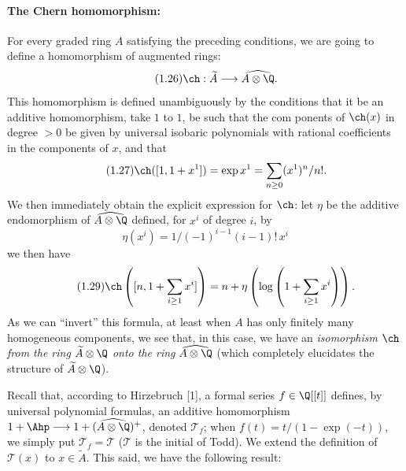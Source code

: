 \paragraph{The Chern homomorphism:}
For every graded ring $A$ satisfying the preceding conditions, we are going to define a homomorphism of augmented rings:
\begin{equation}\tag{1.26}
\ch:\widetilde A\longrightarrow \widehat{A\otimes\Q}.
\end{equation}
This homomorphism is defined unambiguously by the conditions that it be an additive homomorphism, take $1$ to $1$, be such that the com%
%
ponents of $\ch(x)$ in degree $>0$ be given by universal isobaric polynomials with rational coefficients in the components of $x$, and that
\begin{equation}\tag{1.27}
\ch([1,1+x^1])=\exp x^1=\sum_{n\geq0}(x^1)^n/n!.
\end{equation}
We then immediately obtain the explicit expression for $\ch$: let $\eta$ be the additive endomorphism of $\widehat{A\otimes\Q}$ defined, for $x^i$ of degree $i$, by
\begin{equation}\tag{1.28}
\eta(x^i)=1/(-1)^{i-1}(i-1)!\,x^i
\end{equation}
we then have
\begin{equation}\tag{1.29}
\ch\left([n,1+\sum_{i\geq1}x^i]\right)=n+\eta\left(\log\left(1+\sum_{i\geq1}x^i\right)\right).
\end{equation}
As we can ``invert'' this formula, at least when $A$ has only finitely many homogeneous components, we see that, in this case, we have an \emph{isomorphism} $\ch$ \emph{from the ring} $\widetilde A\otimes\Q$ \emph{onto the ring} $\widehat{A\otimes\Q}$ (which completely elucidates the structure of $\widetilde A\otimes\Q$).

Recall that, according to Hirzebruch [1], a formal series $f\in\Q[[t]]$ defines, by universal polynomial formulas, an additive homomorphism $1+\Ahp\longrightarrow 1+(\widehat{A\otimes\Q})^+$, denoted $\mathcal T_f$; when $f(t)=t/(1-\exp(-t))$, we simply put $\mathcal T_f=\mathcal T$ ($\mathcal T$ is the initial of Todd). We extend the definition of $\mathcal T(x)$ to $x\in\widetilde A$. This said, we have the following result:

